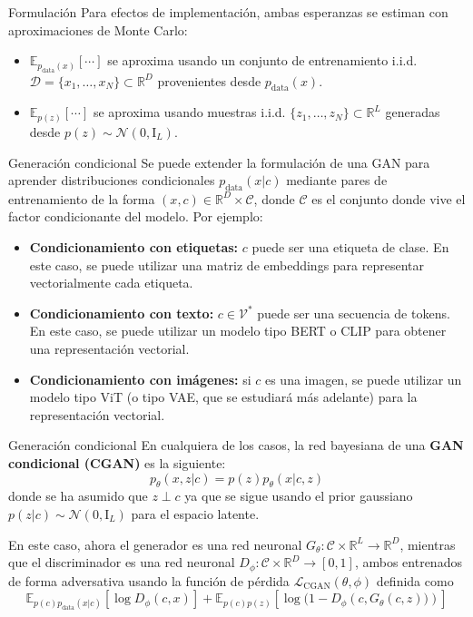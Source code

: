 \documentclass{beamer}
\newcommand{\R}{\mathbb{R}}
\begin{document}
\begin{frame}{Formulación}
    Para efectos de implementación, ambas esperanzas se estiman con aproximaciones de Monte Carlo:
    \begin{itemize}
        \item $\mathbb{E}_{p_\text{data}(x)}[\cdots]$ se aproxima usando un conjunto de entrenamiento i.i.d. $\mathcal{D}=\{x_1,\ldots,x_N\}\subset\R^D$ provenientes desde $p_\text{data}(x)$.
        \item $\mathbb{E}_{p(z)}[\cdots]$ se aproxima usando muestras i.i.d. $\{z_1,\ldots,z_N\}\subset\R^L$ generadas desde $p(z)\sim\mathcal{N}(0,\text{I}_L)$.
    \end{itemize}
\end{frame}

\begin{frame}{Generación condicional}
    Se puede extender la formulación de una GAN para aprender distribuciones condicionales $p_\text{data}(x|c)$ mediante pares de entrenamiento de la forma $(x,c)\in\R^D\times\mathcal{C}$, donde $\mathcal{C}$ es el conjunto donde vive el factor condicionante del modelo. Por ejemplo:
    \begin{itemize}
        \item \textbf{Condicionamiento con etiquetas:} $c$ puede ser una etiqueta de clase. En este caso, se puede utilizar una matriz de embeddings para representar vectorialmente cada etiqueta.
        \item \textbf{Condicionamiento con texto:} $c\in\mathcal{V}^*$ puede ser una secuencia de tokens. En este caso, se puede utilizar un modelo tipo BERT o CLIP para obtener una representación vectorial.
        \item \textbf{Condicionamiento con imágenes:} si $c$ es una imagen, se puede utilizar un modelo tipo ViT (o tipo VAE, que se estudiará más adelante) para la representación vectorial.
    \end{itemize}
\end{frame}

\begin{frame}{Generación condicional}
    En cualquiera de los casos, la red bayesiana de una \textbf{GAN condicional (CGAN)} es la siguiente:
    \begin{equation*}
        p_\theta(x,z|c)=p(z)p_\theta(x|c,z)
    \end{equation*}
    donde se ha asumido que $z\perp c$ ya que se sigue usando el prior gaussiano $p(z|c)\sim\mathcal{N}(0,\text{I}_L)$ para el espacio latente.

    En este caso, ahora el generador es una red neuronal $G_\theta:\mathcal{C}\times\R^L\to\R^D$, mientras que el discriminador es una red neuronal $D_\phi:\mathcal{C}\times\R^D\to[0,1]$, ambos entrenados de forma adversativa usando la función de pérdida $\mathcal{L}_\text{CGAN}(\theta,\phi)$ definida como
    \begin{equation*}
        \mathbb{E}_{p(c)p_\text{data}(x|c)}\left[\log D_\phi(c,x)\right]+\mathbb{E}_{p(c)p(z)}\left[\log (1-D_\phi\left(c,G_\theta(c,z))\right)\right]
    \end{equation*}
\end{frame}
\end{document}
